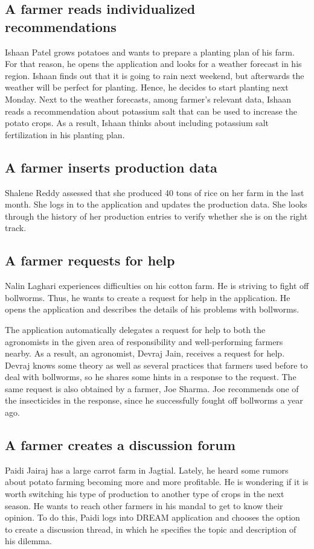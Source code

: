 \subsection*{A farmer reads individualized recommendations}
Ishaan Patel grows potatoes and wants to prepare a planting plan of his farm. For that reason, he opens the application and looks for a weather forecast in his region. Ishaan finds out that it is going to rain next weekend, but afterwards the weather will be perfect for planting. Hence, he decides to start planting next Monday. Next to the weather forecasts, among farmer's relevant data, Ishaan reads a recommendation about potassium salt that can be used to increase the potato crops. As a result, Ishaan thinks about including potassium salt fertilization in his planting plan. 

\subsection*{A farmer inserts production data}
Shalene Reddy assessed that she produced 40 tons of rice on her farm in the last month. She logs in to the application and updates the production data. She looks through the history of her production entries to verify whether she is on the right track. 

\subsection*{A farmer requests for help}
Nalin Laghari experiences difficulties on his cotton farm. He is striving to fight off bollworms. Thus, he wants to create a request for help in the application. He opens the application and describes the details of his problems with bollworms.

The application automatically delegates a request for help to both the agronomists in the given area of responsibility and well-performing farmers nearby. As a result, an agronomist, Devraj Jain, receives a request for help. Devraj knows some theory as well as several practices that farmers used before to deal with bollworms, so he shares some hints in a response to the request. The same request is also obtained by a farmer, Joe Sharma. Joe recommends one of the insecticides in the response, since he successfully fought off bollworms a year ago.

\subsection*{A farmer creates a discussion forum}
Paidi Jairaj has a large carrot farm in Jagtial. Lately, he heard some rumors about potato farming becoming more and more profitable. He is wondering if it is worth switching his type of production to another type of crops in the next season. He wants to reach other farmers in his mandal to get to know their opinion. To do this, Paidi logs into DREAM application and chooses the option to create a discussion thread, in which he specifies the topic and description of his dilemma.

